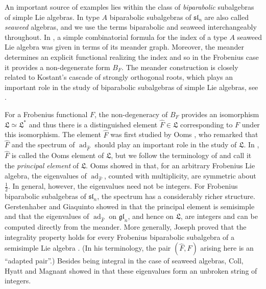 \documentclass{amsart}
\def\sl{\mathfrak{sl}}
\def\gl{\mathfrak{gl}}
\def\L{\mathfrak L}
\def\hatF{\widehat{F}}
\def\sln{\sl_n}
\def\gln{\gl_n}
\def\ad{\operatorname{ad}}
\theoremstyle{definition}
\begin{document}
	An important source of examples lies within the class of \emph{biparabolic} subalgebras of simple Lie algebras. In type $A$ biparabolic subalgebras of $\sln$ are also called \emph{seaweed} algebras, and we use the terms {biparabolic} and {seaweed} interchangeably throughout. In \cite{dergachev2000index}, a simple combinatorial formula for the index of a type $A$ seaweed Lie algebra was given in terms of its meander graph. Moreover, the meander determines an explicit functional realizing the index and so in the Frobenius case it provides a non-degenerate form $B_F$. The meander construction is closely related to Kostant's cascade of strongly
	orthogonal roots, which plays an important role in the study of biparabolic subalgebras of simple Lie algebras, see \cite{panyushev2023combinatorial}.
    	 
	For a Frobenius functional $F$, the non-degeneracy of $B_F$ provides an isomorphism $\L \simeq \L^*$ and thus there is a distinguished element $\hatF \in \L$ corresponding to $F$ under this isomorphism. The element $\hatF$ was first studied by Ooms 
	\cite{ooms1980frobenius}, who remarked that $\hatF$ and the spectrum of $\ad_{\hatF}$ should play an important role 
	in the study of $\L$. In \cite{panyushev2023combinatorial}, $\hatF$ is 
	called the Ooms element of $\L$, but we follow the terminology of 
	\cite{gerstenhaber2009principal} and call it the {\it principal element} 
	of $\L$. Ooms showed in \cite{ooms1980frobenius} that, for an arbitrary Frobenius Lie algebra,
	the eigenvalues of $\ad_{\hatF}$, counted with
	multiplicity, are symmetric about $\frac12$. In general, however, the
	eigenvalues need not be integers. For Frobenius biparabolic subalgebras
	of $\sln$, the spectrum has a considerably richer structure. Gerstenhaber and Giaquinto showed in \cite{gerstenhaber2009principal} that the principal element
	is semisimple and that the eigenvalues of $\ad_{\hatF}$ on $\gln$, and hence on $\L$, are integers and can be computed directly from
	the meander. More generally, Joseph proved that the integrality property holds for
every Frobenius biparabolic subalgebra of a semisimple Lie algebra
\cite{joseph2015integrality}. (In his terminology, the pair
$(\hatF,F)$ arising here is an ``adapted pair''.) Besides being integral in the case of seaweed algebras, Coll, Hyatt and Magnant showed in \cite{coll2018unbroken} that these eigenvalues form an unbroken string of integers. 
	
\end{document}
